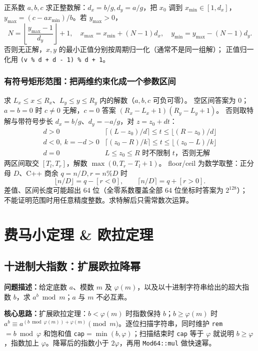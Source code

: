 正系数 $a,b,c$ 求正整数解：$d_x=b/g,d_y=a/g$，把 $x_0$ 调到 $x_{\min}\in[1,d_x]$，
$y_{\max}=(c-ax_{\min})/b$。若 $y_{\max}>0$，
\[
N=\left\lfloor\frac{y_{\max}-1}{d_y}\right\rfloor+1,
\quad x_{\max}=x_{\min}+(N-1)d_x,
\quad y_{\min}=y_{\max}-(N-1)d_y.
\]
否则无正解，$x,y$ 的最小正值分别按周期归一化（通常不是同一组解）；
正值归一化用 \texttt{(v \% d + d - 1) \% d + 1}。

\subsubsection{有符号矩形范围：把两维约束化成一个参数区间}
求 $L_x\le x\le R_x$、$L_y\le y\le R_y$ 内的解数（$a,b,c$ 可负可零）。
空区间答案为 0；$a=b=0$ 时 $c\ne0$ 无解，$c=0$ 答案 $(R_x-L_x+1)(R_y-L_y+1)$。
否则取特解与带符号步长 $d_x=b/g$、$d_y=-a/g$，对 $z=z_0+dt$：
\[
\begin{array}{c|c}
 d>0 & \lceil(L-z_0)/d\rceil\le t\le\lfloor(R-z_0)/d\rfloor\\[2pt]
 d<0,\ k=-d>0 & \lceil(z_0-R)/k\rceil\le t\le\lfloor(z_0-L)/k\rfloor\\[2pt]
 d=0 & L\le z_0\le R\text{ 时不限制 }t\text{，否则无解}
\end{array}
\]
两区间取交 $[T_l,T_r]$，解数 $\max(0,T_r-T_l+1)$。
floor/ceil 为数学取整：正分母 $D$、C++ 商余 $q=n/D,r=n\%D$ 时
\[
\lfloor n/D\rfloor=q-[r<0],\qquad
\lceil n/D\rceil=q+[r>0].
\]
差值、区间长度可能超出 64 位（全零系数覆盖全部 64 位坐标时答案为 $2^{128}$）；
不能证明范围时用任意精度整数。求特解后只需常数次运算。


\Needspace{513pt}

\section{费马小定理 \& 欧拉定理}

\subsection{十进制大指数：扩展欧拉降幂}\label{compact-euler_power}

\noindent\textbf{问题描述：}\allowbreak 给定底数 $a$、模数 $m$ 及 $\varphi(m)$，以及以十进制字符串给出的超大指数 $b$，求 $a^b\bmod m$；$a$ 与 $m$ 不必互素。

\textbf{核心思路：}\allowbreak 扩展欧拉定理：$b<\varphi(m)$ 时指数保持 $b$；$b\ge\varphi(m)$ 时 $a^b\equiv a^{(b\bmod\varphi(m))+\varphi(m)}\pmod m$。逐位扫描字符串，同时维护 \texttt{rem}$=b\bmod\varphi$ 和饱和值 \texttt{cap}$=\min(b,\varphi)$；扫描结束时 \texttt{cap} 等于 $\varphi$ 就说明 $b\ge\varphi$，指数加上 $\varphi$。降幂后的指数小于 $2\varphi$，再用 \texttt{Mod64::mul} 做快速幂。

